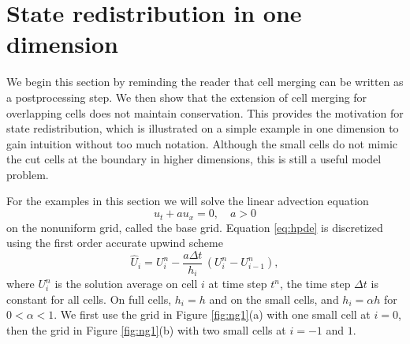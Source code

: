 \section{State redistribution in one dimension} \label{sec:srd1d}
We begin this section  by reminding the reader that cell merging can
be written as a postprocessing step. We then show that the extension of
cell merging for overlapping cells does not maintain conservation. This
provides the motivation for state redistribution, which is illustrated on
a simple example in one dimension to gain intuition without too much
notation.  Although the small cells do not mimic the cut cells at the 
boundary in higher dimensions, this is still a useful model problem. 

For the examples in this section we will solve the linear advection equation
\begin{equation}\label{eq:hpde}
u_t + au_x = 0, \quad a>0
\end{equation}
on the nonuniform grid, called the base grid. Equation \eqref{eq:hpde} is
discretized  using the  first order
accurate upwind scheme 
\begin{equation}\label{eq:unstable1d}
\widehat{U}_i = U^n_i - \frac{a \Delta t} {h_i} \, (U^n_i -U^n_{i-1}),
\end{equation}
where $U^n_i$ is the solution average on cell $i$ at time step $t^n$, the time
step $\Delta t$ is constant for all cells. On full cells, $h_i = h$ and on
the small cells,  and $h_i = \alpha h$ for $ 0 < \alpha < 1$.
We first use
the grid in Figure \ref{fig:ng1}(a) with one small cell at $i=0$, then the grid
in Figure \ref{fig:ng1}(b) with two small cells at $i = -1$ and $1$.


